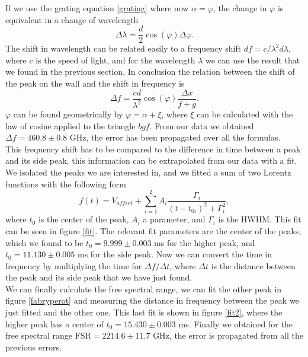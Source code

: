 \documentclass[a4paper,10pt]{article}
\begin{document}
If we use the grating equation \eqref{grating} where now $\alpha = \varphi$, the change in $\varphi$ is equivalent in a change of wavelength
\begin{equation}\Delta \lambda = \frac{d}{2}\cos(\varphi)\Delta \varphi.\end{equation}
The shift in wavelength can be related easily to a frequency shift $df = c/\lambda^2 d\lambda$, where $c$ is the speed of light, and for the wavelength $\lambda$ we can use the result that we found in the previous section. In conclusion the relation between the shift of the peak on the wall and the shift in frequency is
\begin{equation}\Delta f = \frac{cd}{\lambda^2} \cos(\varphi)\frac{\Delta x}{f+g}.\end{equation}
$\varphi$ can be found geometrically by $\varphi = \alpha + \xi$, where $\xi$ can be calculated with the law of cosine applied to the triangle $bgf$. From our data we obtained $\Delta f = 460.8 \pm 0.8$ GHz, the error has been propagated over all the formulas.\\
This frequency shift has to be compared to the difference in time between a peak and its side peak, this information can be extrapolated from our data with a fit. We isolated the peaks we are interested in, and we fitted a sum of two Lorentz functions with the following form
\begin{equation}f(t) = V_{offset}+\sum_{i=1}^2 A_i \frac{\Gamma_i}{(t-t_{0i})^2 + \Gamma_i^2},\end{equation}
where $t_0$ is the center of the peak, $A_i$ a parameter, and $\Gamma_i$ is the HWHM. This fit can be seen in figure \ref{fit}. The relevant fit parameters are the center of the peaks, which we found to be $t_{0} = 9.999 \pm 0.003$ ms for the higher peak, and $t_0 = 11.130\pm  0.005$ ms for the side peak. Now we can convert the time in frequency by multiplying the time for $\Delta f/\Delta t$, where $\Delta t$ is the distance between the peak and its side peak that we have just found.\\
We can finally calculate the free spectral range, we can fit the other peak in figure \ref{fabryperot} and measuring the distance in frequency between the peak we just fitted and the other one. This last fit is shown in figure \ref{fit2}, where the higher peak has a center of $t_0 = 15.430\pm 0.003$ ms. Finally we obtained for the free spectral range $\text{FSR}  = 2214.6\pm 11.7$ GHz, the error is propagated from all the previous errors.
\end{document}

